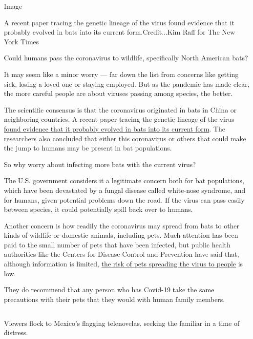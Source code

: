 Image

A recent paper tracing the genetic lineage of the virus found evidence
that it probably evolved in bats into its current form.Credit...Kim Raff
for The New York Times

Could humans pass the coronavirus to wildlife, specifically North
American bats?

It may seem like a minor worry --- far down the list from concerns like
getting sick, losing a loved one or staying employed. But as the
pandemic has made clear, the more careful people are about viruses
passing among species, the better.

The scientific consensus is that the coronavirus originated in bats in
China or neighboring countries. A recent paper tracing the genetic
lineage of the virus
\href{https://www.nature.com/articles/s41564-020-0771-4}{found evidence
that it probably evolved in bats into its current form}. The researchers
also concluded that either this coronavirus or others that could make
the jump to humans may be present in bat populations.

So why worry about infecting more bats with the current virus?

The U.S. government considers it a legitimate concern both for bat
populations, which have been devastated by a fungal disease called
white-nose syndrome, and for humans, given potential problems down the
road. If the virus can pass easily between species, it could potentially
spill back over to humans.

Another concern is how readily the coronavirus may spread from bats to
other kinds of wildlife or domestic animals, including pets. Much
attention has been paid to the small number of pets that have been
infected, but public health authorities like the Centers for Disease
Control and Prevention have said that, although information is limited,
\href{https://www.cdc.gov/coronavirus/2019-ncov/daily-life-coping/pets.html}{the
risk of pets spreading the virus to people} is low.

They do recommend that any person who has Covid-19 take the same
precautions with their pets that they would with human family members.

\hypertarget{-11}{%
\subsection{}\label{-11}}

Viewers flock to Mexico's flagging telenovelas, seeking the familiar in
a time of distress.

